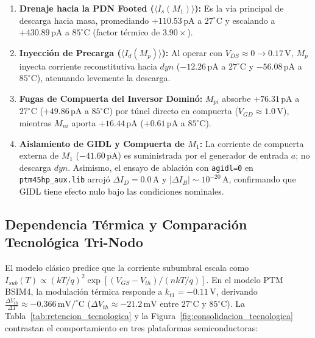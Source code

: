 

\begin{enumerate}[leftmargin=1.4em,itemsep=0.12em]
  \item \textbf{Drenaje hacia la PDN Footed ($\langle I_s(M_1) \rangle$):} Es la vía principal de descarga hacia masa, promediando $+110.53\,\text{pA}$ a $27^\circ\text{C}$ y escalando a $+430.89\,\text{pA}$ a $85^\circ\text{C}$ (factor térmico de $\mathbf{3.90\times}$).
  \item \textbf{Inyección de Precarga ($\langle I_d(M_p) \rangle$):} Al operar con $V_{DS} \approx 0 \to 0.17\,\text{V}$, $M_p$ inyecta corriente reconstitutiva hacia $dyn$ ($-12.26\,\text{pA}$ a $27^\circ\text{C}$ y $-56.08\,\text{pA}$ a $85^\circ\text{C}$), atenuando levemente la descarga.
  \item \textbf{Fugas de Compuerta del Inversor Dominó:} $M_{pi}$ absorbe $+76.31\,\text{pA}$ a $27^\circ\text{C}$ ($+49.86\,\text{pA}$ a $85^\circ\text{C}$) por túnel directo en compuerta ($V_{GD} \approx 1.0\,\text{V}$), mientras $M_{ni}$ aporta $+16.44\,\text{pA}$ ($+0.61\,\text{pA}$ a $85^\circ\text{C}$).
  \item \textbf{Aislamiento de GIDL y Compuerta de $M_1$:} La corriente de compuerta externa de $M_1$ ($-41.60\,\text{pA}$) es suministrada por el generador de entrada $a$; no descarga $dyn$. Asimismo, el ensayo de ablación con \texttt{agidl=0} en \texttt{ptm45hp\_aux.lib} arrojó $\Delta I_D = 0.0\,\text{A}$ y $|\Delta I_B| \sim 10^{-20}\,\text{A}$, confirmando que GIDL tiene efecto nulo bajo las condiciones nominales.
\end{enumerate}

\subsection{Dependencia Térmica y Comparación Tecnológica Tri-Nodo}
El modelo clásico predice que la corriente subumbral escala como $I_{sub}(T) \propto (k T / q)^2 \exp[(V_{GS} - V_{th})/(n k T / q)]$. En el modelo PTM BSIM4, la modulación térmica responde a $k_{t1} = -0.11\,\text{V}$, derivando $\frac{\Delta V_{th}}{\Delta T} \approx -0.366\,\text{mV/}^\circ\text{C}$ ($\Delta V_{th} \approx -21.2\,\text{mV}$ entre $27^\circ\text{C}$ y $85^\circ\text{C}$).
\noindent La Tabla~\ref{tab:retencion_tecnologica} y la Figura~\ref{fig:consolidacion_tecnologica} contrastan el comportamiento en tres plataformas semiconductoras:



